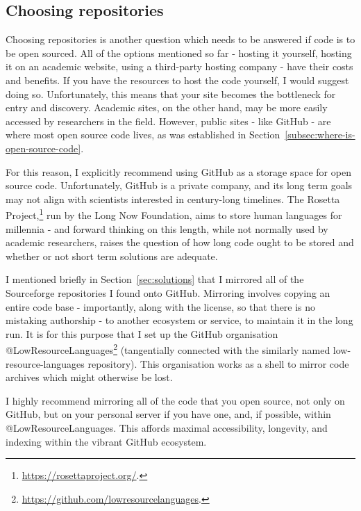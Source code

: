 \subsection{Choosing repositories}
\label{choosing-repositories}

Choosing repositories is another question which needs to be answered if code is to be open sourced. All of the options mentioned so far - hosting it yourself, hosting it on an academic website, using a third-party hosting company - have their costs and benefits. If you have the resources to host the code yourself, I would suggest doing so. Unfortunately, this means that your site becomes the bottleneck for entry and discovery. Academic sites, on the other hand, may be more easily accessed by researchers in the field. However, public sites - like GitHub - are where most open source code lives, as was established in Section~\ref{subsec:where-is-open-source-code}.

For this reason, I explicitly recommend using GitHub as a storage space for open source code. Unfortunately, GitHub is a private company, and its long term goals may not align with scientists interested in century-long timelines. The Rosetta Project,\footnote{\href{https://rosettaproject.org/}{https://rosettaproject.org/}. } run by the Long Now Foundation, aims to store human languages for millennia - and forward thinking on this length, while not normally used by academic researchers, raises the question of how long code ought to be stored and whether or not short term solutions are adequate.

I mentioned briefly in Section~\ref{sec:solutions} that I mirrored all of the Sourceforge repositories I found onto GitHub. Mirroring involves copying an entire code base - importantly, along with the license, so that there is no mistaking authorship - to another ecosystem or service, to maintain it in the long run. It is for this purpose that I set up the GitHub organisation @LowResourceLanguages\footnote{\href{https://github.com/lowresourcelanguages}{https://github.com/lowresourcelanguages}. } (tangentially connected with the similarly named low-resource-languages repository). This organisation works as a shell to mirror code archives which might otherwise be lost.

I highly recommend mirroring all of the code that you open source, not only on GitHub, but on your personal server if you have one, and, if possible, within @LowResourceLanguages. This affords maximal accessibility, longevity, and indexing within the vibrant GitHub ecosystem.

